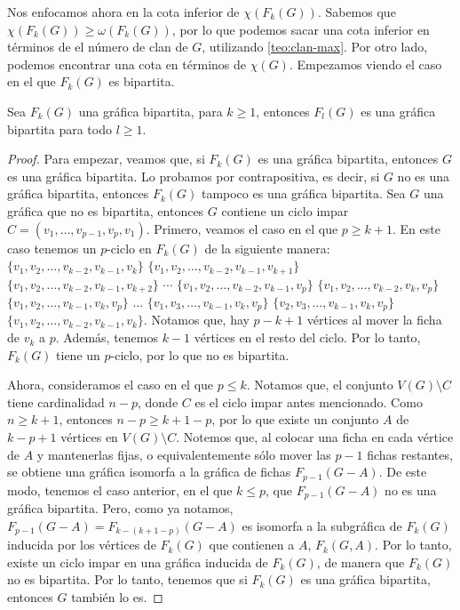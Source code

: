 Nos enfocamos ahora en la cota inferior de $ \chi (F_k(G))$. Sabemos que $\chi
(F_k(G)) \geq \omega (F_k(G))$, por lo que podemos sacar una cota inferior en
t\'erminos de el n\'umero de clan de $G$, utilizando \cref{teo:clan-max}. Por
otro lado, podemos encontrar una cota en t\'erminos de $\chi (G)$. Empezamos
viendo el caso en el que $F_k(G)$ es bipartita.


\begin{proposicion}
\label{prop:biparticion F(G)}
    Sea $F_k(G)$ una gr\'afica bipartita, para $k \geq 1$, entonces $F_l(G)$ es
    una gr\'afica bipartita para todo $l \geq 1$.
\end{proposicion}

\begin{proof}
    Para empezar, veamos que, si $F_k(G)$ es una gr\'afica bipartita, entonces
    $G$ es una gr\'afica bipartita. Lo probamos por contrapositiva, es decir, si
    $G$ no es una gr\'afica bipartita, entonces $F_k(G)$ tampoco es una
    gr\'afica bipartita. Sea $G$ una gr\'afica que no es bipartita, entonces $G$
    contiene un ciclo impar $C=(v_1, \dots, v_{p-1}, v_p, v_1)$. Primero, veamos
    el caso en el que $p \geq k+1$. En este caso tenemos un $p$-ciclo en
    $F_k(G)$ de la siguiente manera: $\{v_1, v_2, \dots, v_{k-2}, v_{k-1},
    v_k\}$ $\{v_1, v_2, \dots, v_{k-2}, v_{k-1}, v_{k+1}\}$ $\{v_1, v_2, \dots,
    v_{k-2}, v_{k-1}, v_{k+2}\}$ $\cdots$ $\{v_1, v_2, \dots, v_{k-2}, v_{k-1},
    v_p\}$ $\{v_1, v_2, \dots, v_{k-2}, v_k, v_p\}$ $\{v_1, v_2, \dots, v_{k-1},
    v_k, v_p\}$ $\dots$ $\{v_1, v_3, \dots, v_{k-1}, v_k, v_p\}$ $\{v_2, v_3,
    \dots, v_{k-1}, v_k, v_p\}$ $\{v_1, v_2, \dots, v_{k-2}, v_{k-1}, v_k\}$.
    Notamos que, hay $p-k+1$ v\'ertices al mover la ficha de $v_k$ a $p$.
    Adem\'as, tenemos $k-1$ v\'ertices en el resto del ciclo. Por lo tanto,
    $F_k(G)$ tiene un $p$-ciclo, por lo que no es bipartita.
    
    Ahora, consideramos el caso en el que $p \leq k$. Notamos que, el conjunto
    $V(G)\setminus C$ tiene cardinalidad $n-p$, donde $C$ es el ciclo impar
    antes mencionado. Como $n \geq k+1$, entonces $n-p \geq k+1-p$, por lo que
    existe un conjunto $A$ de $k-p+1$ v\'ertices en $V(G)\setminus C$. Notemos
    que, al colocar una ficha en cada v\'ertice de $A$ y mantenerlas fijas, o
    equivalentemente s\'olo mover las $p-1$ fichas restantes, se obtiene una
    gr\'afica isomorfa a la gr\'afica de fichas $F_{p-1}(G-A)$. De este modo,
    tenemos el caso anterior, en el que $k \leq p$, que $F_{p-1}(G-A)$ no es una
    gr\'afica bipartita. Pero, como ya notamos, $F_{p-1}(G-A) = F_{k-(k+1-p)}
    (G-A)$ es isomorfa a la subgr\'afica de $F_k(G)$ inducida por los v\'ertices
    de $F_k(G)$ que contienen a $A$, $F_k(G,A)$. Por lo tanto, existe un ciclo
    impar en una gr\'afica inducida de $F_k(G)$, de manera que $F_k(G)$ no es
    bipartita. Por lo tanto, tenemos que si $F_k(G)$ es una gr\'afica bipartita,
    entonces $G$ tambi\'en lo es.


\end{proof}
